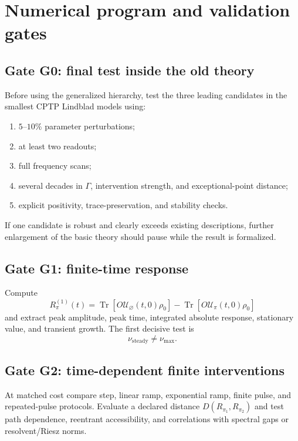 \documentclass[11pt]{article}
\theoremstyle{definition}
\theoremstyle{remark}
\DeclareMathOperator{\Tr}{Tr}
\newcommand{\cU}{\mathcal U}
\begin{document}
\section{Numerical program and validation gates}

\subsection{Gate G0: final test inside the old theory}

Before using the generalized hierarchy, test the three leading candidates in the smallest CPTP Lindblad models using:
\begin{enumerate}
  \item $5$--$10\%$ parameter perturbations;
  \item at least two readouts;
  \item full frequency scans;
  \item several decades in $\Gamma$, intervention strength, and exceptional-point distance;
  \item explicit positivity, trace-preservation, and stability checks.
\end{enumerate}
If one candidate is robust and clearly exceeds existing descriptions, further enlargement of the basic theory should pause while the result is formalized.

\subsection{Gate G1: finite-time response}

Compute
\begin{equation}
R_{\pi}^{(1)}(t)
 = \Tr\!\left[O\cU_{\varnothing}(t,0)\rho_0\right]
 - \Tr\!\left[O\cU_{\pi}(t,0)\rho_0\right]
\label{eq:G1}
\end{equation}
and extract peak amplitude, peak time, integrated absolute response, stationary value, and transient growth. The first decisive test is
\begin{equation}
\nu_{\mathrm{steady}}\neq\nu_{\max}.
\end{equation}

\subsection{Gate G2: time-dependent finite interventions}

At matched cost compare step, linear ramp, exponential ramp, finite pulse, and repeated-pulse protocols. Evaluate a declared distance $D(R_{\pi_1},R_{\pi_2})$ and test path dependence, reentrant accessibility, and correlations with spectral gaps or resolvent/Riesz norms.
\end{document}
